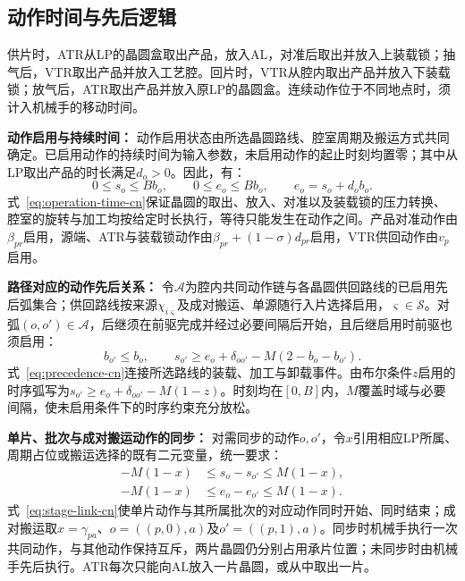 \documentclass[preprint,12pt,nonatbib]{elsarticle}
\begin{document}
\subsection{动作时间与先后逻辑}
\label{sec:model-time-cn}

供片时，ATR从LP的晶圆盒取出产品，放入AL，对准后取出并放入上装载锁；抽气后，VTR取出产品并放入工艺腔。回片时，VTR从腔内取出产品并放入下装载锁；放气后，ATR取出产品并放入原LP的晶圆盒。连续动作位于不同地点时，须计入机械手的移动时间。

\noindent\textbf{动作启用与持续时间：}
动作启用状态由所选晶圆路线、腔室周期及搬运方式共同确定。已启用动作的持续时间为输入参数，未启用动作的起止时刻均置零；其中从LP取出产品的时长满足$d_o>0$。因此，有：
\begin{equation}
0\le s_o\le B b_o,\qquad
0\le e_o\le B b_o,\qquad
e_o=s_o+d_ob_o.
\label{eq:operation-time-cn}
\end{equation}
式~\eqref{eq:operation-time-cn}保证晶圆的取出、放入、对准以及装载锁的压力转换、腔室的旋转与加工均按给定时长执行，等待只能发生在动作之间。产品对准动作由$\beta_{pr}$启用，源端、ATR与装载锁动作由$\beta_{pr}+(1-\sigma)d_{pr}$启用，VTR供回动作由$v_p$启用。

\noindent\textbf{路径对应的动作先后关系：}
令$\mathcal A$为腔内共同动作链与各晶圆供回路线的已启用先后弧集合；供回路线按来源$\chi_{i\varsigma}$及成对搬运、单源随行入片选择启用，$\varsigma\in\mathcal S$。对弧$(o,o')\in\mathcal A$，后继须在前驱完成并经过必要间隔后开始，且后继启用时前驱也须启用：
\begin{equation}
b_{o'}\le b_o,\qquad
s_{o'}\ge e_o+\delta_{oo'}-M(2-b_o-b_{o'}).
\label{eq:precedence-cn}
\end{equation}
式~\eqref{eq:precedence-cn}连接所选路线的装载、加工与卸载事件。由布尔条件$z$启用的时序弧写为$s_{o'}\ge e_o+\delta_{oo'}-M(1-z)$。时刻均在$[0,B]$内，$M$覆盖时域与必要间隔，使未启用条件下的时序约束充分放松。

\noindent\textbf{单片、批次与成对搬运动作的同步：}
对需同步的动作$o,o'$，令$x$引用相应LP所属、周期占位或搬运选择的既有二元变量，统一要求：
\begin{equation}
\begin{aligned}
-M(1-x)&\le s_o-s_{o'}\le M(1-x),\\
-M(1-x)&\le e_o-e_{o'}\le M(1-x).
\end{aligned}
\label{eq:stage-link-cn}
\end{equation}
式~\eqref{eq:stage-link-cn}使单片动作与其所属批次的对应动作同时开始、同时结束；成对搬运取$x=\gamma_{pa}$、$o=((p,0),a)$及$o'=((p,1),a)$。同步时机械手执行一次共同动作，与其他动作保持互斥，两片晶圆仍分别占用承片位置；未同步时由机械手先后执行。ATR每次只能向AL放入一片晶圆，或从中取出一片。
\end{document}
